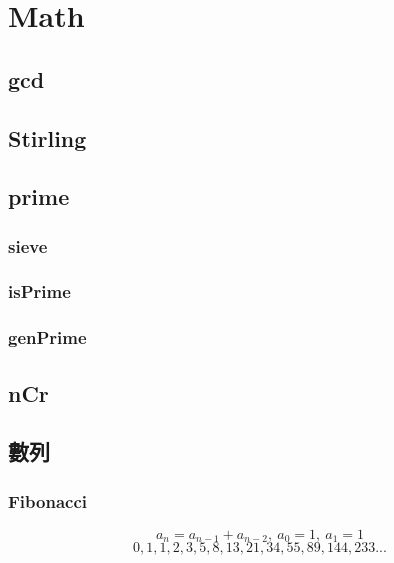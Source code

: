 \section{Math}

\subsection{gcd}


\subsection{Stirling}


\subsection{prime}
\subsubsection{sieve}


\subsubsection{isPrime}


\subsubsection{genPrime}


% 

\subsection{nCr}


\subsection{數列}
\subsubsection{Fibonacci}
\[a_{n} = a_{n-1} + a_{n-2},\ a_0 = 1,\ a_1 = 1\]
\[0, 1, 1, 2, 3, 5, 8, 13, 21, 34, 55, 89, 144, 233...\]

